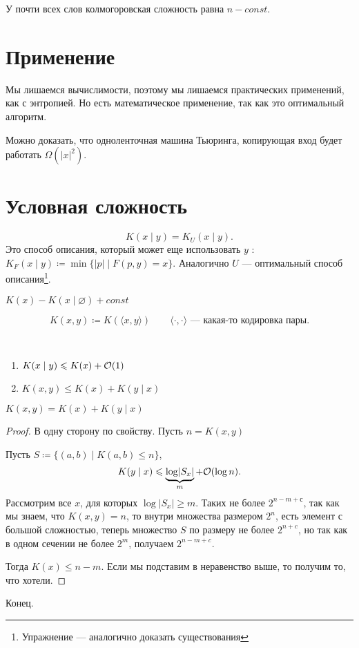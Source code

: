 \begin{cor}
    У почти всех слов колмогоровская сложность равна $ n- const$.
\end{cor}

\section{Применение}
Мы лишаемся вычислимости, поэтому мы лишаемся практических применений, как с энтропией. Но есть математическое применение, так как это оптимальный алгоритм.

Можно доказать, что одноленточная машина Тьюринга, копирующая вход будет работать $ \Omega( \lvert x \rvert ^2)$.

\section{Условная сложность}
\[
	K(x \mid y) = K_{U}\left( x \mid y \right) 
.\] 
Это способ описания, который может еще использовать $ y$ : 
$ K_{F}(x \mid y) \coloneqq \min \{\lvert p \rvert \mid F(p, y) = x\}$. Аналогично $ U$ --- оптимальный способ описания\footnote{Упражнение --- аналогично доказать существования}.

\begin{note}
	$ K(x) - K(x \mid \varnothing) + const$
\end{note}
\[
	K(x, y) \coloneqq K(\langle x, y \rangle) \qquad \langle\cdot  , \cdot \rangle\text{ --- какая-то кодировка пары}
.\] 
\begin{prop}
    ~\begin{enumerate}
		\item $ K(x \mid y) \leqslant  K(x) + \mathcal{O}(1)$
		\item $ K(x, y) \le  K(x) + K(y \mid x)$
    \end{enumerate}
\end{prop}

\begin{thm}
	$ K(x, y) =  K(x) + K(y \mid x)$
\end{thm}
\begin{proof}
	В одну сторону по свойству. Пусть  $ n = K(x, y) $ 
\begin{figure}[ht]
    \centering
    \label{fig:kolmo-thm}
\end{figure}
Пусть $ S \coloneqq \{(a, b) \mid K(a, b) \le n\}$,
\[
	K(y \mid x) \leqslant  \underbrace{\log \lvert   S_x\rvert}_{m} + \mathcal{O}(\log n)
.\] 
Рассмотрим все $ x$, для которых $ \log \lvert S_x \rvert  \ge  m$. Таких не более $ 2^{n-m + с}$, так как мы знаем, что $ K(x, y) = n$, то внутри множества размером  $ 2^{n}$, есть элемент с большой сложностью, теперь множество $ S$ по размеру не более  $ 2^{n+c}$, но так как в одном сечении не более $ 2^{m}$, получаем  $ 2^{n-m+c}$.

Тогда $ K(x) \le n -m $. Если мы подставим в неравенство выше, то получим то, что хотели.
\end{proof}
Конец.
